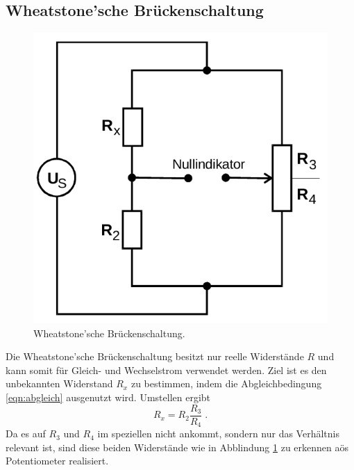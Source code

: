 \subsection{Wheatstone'sche Brückenschaltung}
\label{sec:wheatstone}
\begin{figure}[H]
    \centering
    \includegraphics[scale=0.4]{pictures/2-wheatstone.png}
    \caption{Wheatstone'sche Brückenschaltung. \cite{AP01}}
    \label{fig:wheatstone}
\end{figure}
Die Wheatstone'sche Brückenschaltung besitzt nur reelle Widerstände $R$ und kann somit für Gleich- und Wechselstrom verwendet werden.
Ziel ist es den unbekannten Widerstand $R_x$ zu bestimmen, indem die Abgleichbedingung \eqref{eqn:abgleich} ausgenutzt wird. Umstellen
ergibt
\begin{equation}
    R_x=R_2\frac{R_3}{R_4} \;.
    \label{eqn:wheatstone}
\end{equation}
Da es auf $R_3$ und $R_4$ im speziellen nicht ankommt, sondern nur das Verhältnis relevant ist, sind diese beiden Widerstände wie in 
Abblindung \ref{fig:wheatstone} zu erkennen aös Potentiometer realisiert. 

